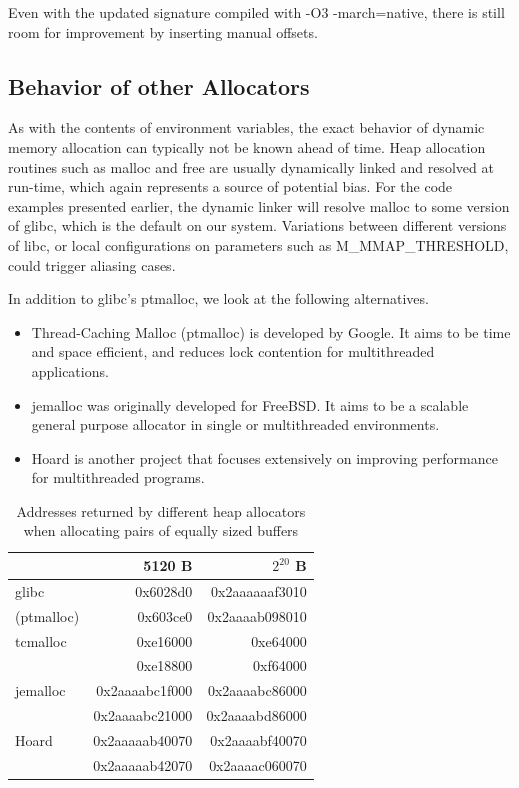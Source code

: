 \documentclass[a4paper,10pt,twocolumn,twoside]{article}
\begin{document}
Even with the updated signature compiled with -O3 -march=native, there is still room for improvement by inserting manual offsets.


\subsection{Behavior of other Allocators}
As with the contents of environment variables, the exact behavior of dynamic memory allocation can typically not be known ahead of time.
Heap allocation routines such as malloc and free are usually dynamically linked and resolved at run-time, which again represents a source of potential bias.
For the code examples presented earlier, the dynamic linker will resolve malloc to some version of glibc, which is the default on our system.
Variations between different versions of libc, or local configurations on parameters such as M\_MMAP\_THRESHOLD, could trigger aliasing cases.

In addition to glibc's ptmalloc, we look at the following alternatives.
\begin{itemize}
 \item Thread-Caching Malloc (ptmalloc) is developed by Google. It aims to be time and space efficient, and reduces lock contention for multithreaded applications. \cite{TCMalloc}
 \item jemalloc was originally developed for FreeBSD. It aims to be a scalable general purpose allocator in single or multithreaded environments. \cite{JEMalloc}
 \item Hoard is another project that focuses extensively on improving performance for multithreaded programs. \cite{Berger:2000:Hoard}
\end{itemize}

\begin{table}[t]
  \caption{Addresses returned by different heap allocators when allocating pairs of equally sized buffers}
  \label{tab:mallocompare}
  \centering
  \small
  \begin{tabular}{l r r}
    \toprule
                      & 5120 B          & $2^{20}$ B \\
    \midrule
    glibc             & 0x6028d0        & 0x2aaaaaaf3010 \\
    (ptmalloc)        & 0x603ce0        & 0x2aaaab098010 \\
    \midrule
    tcmalloc          & 0xe16000        & 0xe64000 \\
                      & 0xe18800        & 0xf64000 \\
    \midrule
    jemalloc          & 0x2aaaabc1f000  & 0x2aaaabc86000 \\
                      & 0x2aaaabc21000  & 0x2aaaabd86000 \\
    \midrule
    Hoard             & 0x2aaaaab40070  & 0x2aaaabf40070 \\
                      & 0x2aaaaab42070  & 0x2aaaac060070 \\
    \bottomrule
  \end{tabular}
\end{table}
\end{document}
